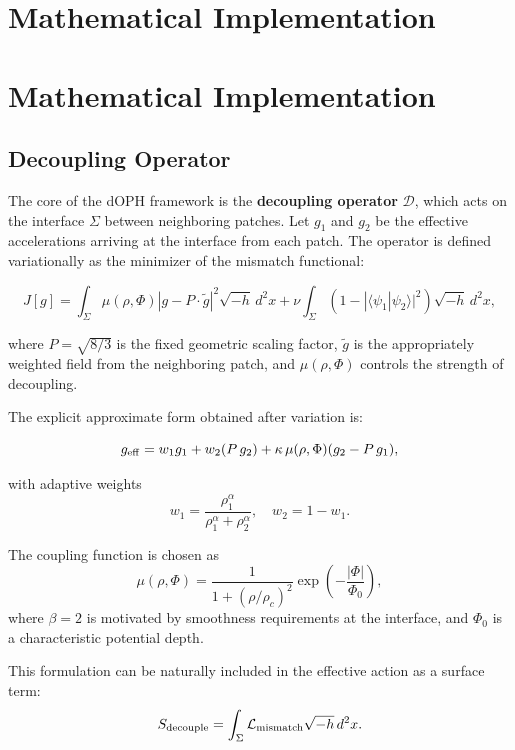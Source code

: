 \documentclass[12pt,a4paper]{article}
\begin{document}
\section{Mathematical Implementation}
\section{Mathematical Implementation}

\subsection{Decoupling Operator}

The core of the dOPH framework is the \textbf{decoupling operator} \(\mathcal{D}\), which acts on the interface \(\Sigma\) between neighboring patches. Let \(g_1\) and \(g_2\) be the effective accelerations arriving at the interface from each patch. The operator is defined variationally as the minimizer of the mismatch functional:

\begin{equation}
J[g] = \int_{\Sigma} \mu(\rho, \Phi) \left| g - P \cdot \tilde{g} \right|^2 \sqrt{-h} \, d^2x 
+ \nu \int_{\Sigma} \left(1 - |\langle \psi_1 | \psi_2 \rangle|^2 \right) \sqrt{-h} \, d^2x,
\label{eq:decoupling_functional}
\end{equation}

where \(P = \sqrt{8/3}\) is the fixed geometric scaling factor, \(\tilde{g}\) is the appropriately weighted field from the neighboring patch, and \(\mu(\rho, \Phi)\) controls the strength of decoupling.

The explicit approximate form obtained after variation is:

\begin{equation}
g_{\rm eff} = w_1 g_1 + w_2 (P \, g_2) + \kappa \, \mu(\rho, \Phi) (g_2 - P \, g_1),
\label{eq:geff}
\end{equation}

with adaptive weights
\[
w_1 = \frac{\rho_1^\alpha}{\rho_1^\alpha + \rho_2^\alpha}, \quad w_2 = 1 - w_1.
\]

The coupling function is chosen as
\[
\mu(\rho, \Phi) = \frac{1}{1 + (\rho / \rho_c)^2} \exp\left( -\frac{|\Phi|}{\Phi_0} \right),
\]
where \(\beta = 2\) is motivated by smoothness requirements at the interface, and \(\Phi_0\) is a characteristic potential depth.

This formulation can be naturally included in the effective action as a surface term:
\[
S_{\rm decouple} = \int_{\Sigma} \mathcal{L}_{\rm mismatch} \sqrt{-h} \, d^2x.
\]
\end{document}
